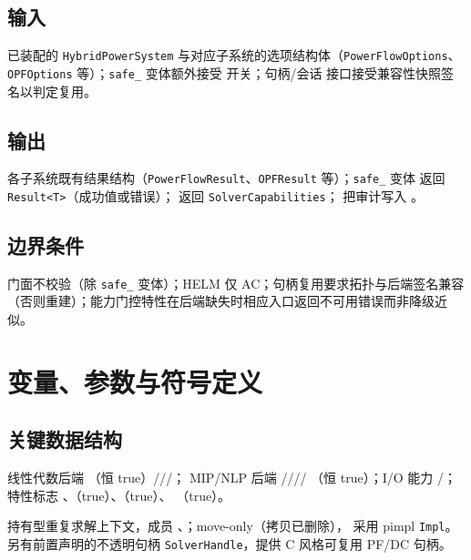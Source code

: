 \documentclass[UTF8,fontset=fandol,a4paper,11pt]{ctexart}
\begin{document}
\subsection{输入}
已装配的 \texttt{HybridPowerSystem} 与对应子系统的选项结构体（\texttt{PowerFlowOptions}、
\texttt{OPFOptions} 等）；\texttt{safe\_} 变体额外接受  开关；句柄/会话
接口接受兼容性快照签名以判定复用。

\subsection{输出}
各子系统既有结果结构（\texttt{PowerFlowResult}、\texttt{OPFResult} 等）；\texttt{safe\_} 变体
返回 \texttt{Result<T>}（成功值或错误）； 返回
\texttt{SolverCapabilities}； 把审计写入 。

\subsection{边界条件}
门面不校验（除 \texttt{safe\_} 变体）；HELM 仅 AC；句柄复用要求拓扑与后端签名兼容
（否则重建）；能力门控特性在后端缺失时相应入口返回不可用错误而非降级近似。

\section{变量、参数与符号定义}
\subsection{关键数据结构}
线性代数后端 （恒 true）///；
MIP/NLP 后端 ////
（恒 true）；I/O 能力 /；特性标志
、（true）、（true）、
（true）。

持有型重复求解上下文，成员 、；move-only（拷贝已删除），
采用 pimpl \texttt{Impl}。另有前置声明的不透明句柄 \texttt{SolverHandle}，提供 C 风格可复用
PF/DC 句柄。
\end{document}
